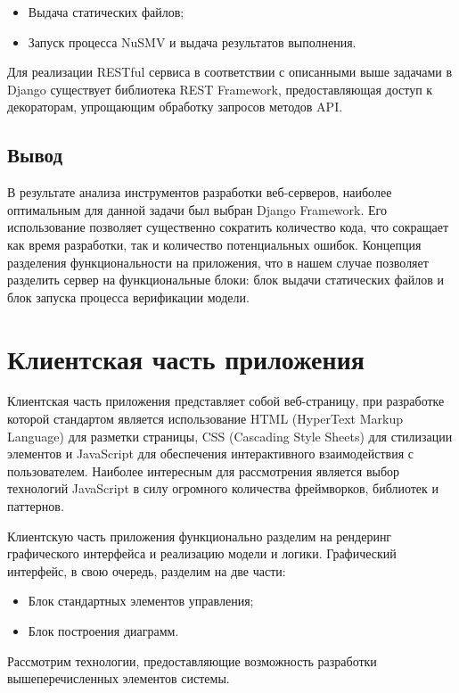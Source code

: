 \begin{itemize}
	\item Выдача статических файлов;
	\item Запуск процесса NuSMV и выдача результатов выполнения.
\end{itemize}

Для реализации RESTful сервиса в соответствии с описанными выше задачами в Django существует библиотека REST Framework, предоставляющая доступ к декораторам, упрощающим обработку запросов методов API.

\subsection{Вывод} 

В результате анализа инструментов разработки веб-серверов, наиболее оптимальным для данной задачи был выбран Django Framework. Его использование позволяет существенно сократить количество кода, что сокращает как время разработки, так и количество потенциальных ошибок. Концепция разделения функциональности на приложения, что в нашем случае позволяет разделить сервер на функциональные блоки: блок выдачи статических файлов и блок запуска процесса верификации модели. 

\section{Клиентская часть приложения}

Клиентская часть приложения представляет собой веб-страницу, при разработке которой стандартом является использование HTML (HyperText Markup Language) для разметки страницы, CSS (Cascading Style Sheets) для стилизации элементов и JavaScript для обеспечения интерактивного взаимодействия с пользователем. Наиболее интересным для рассмотрения является выбор технологий JavaScript в силу огромного количества фреймворков, библиотек и паттернов.

Клиентскую часть приложения функционально разделим на рендеринг графического интерфейса и реализацию модели и логики. Графический интерфейс, в свою очередь, разделим на две части:

\begin{itemize}
	\item Блок стандартных элементов управления;
	\item Блок построения диаграмм.
\end{itemize}

Рассмотрим технологии, предоставляющие возможность разработки вышеперечисленных элементов системы.

